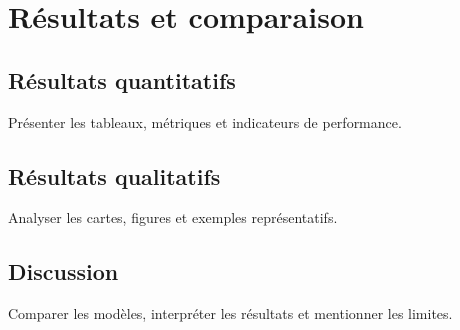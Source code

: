 \chapter{Résultats et comparaison}\label{chap:resultats}
\chaptertoc

\section{Résultats quantitatifs}
Présenter les tableaux, métriques et indicateurs de performance.

\section{Résultats qualitatifs}
Analyser les cartes, figures et exemples représentatifs.

\section{Discussion}
Comparer les modèles, interpréter les résultats et mentionner les limites.

\stopcontents[chapters]
